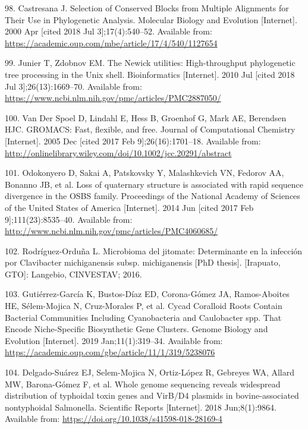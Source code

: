 \documentclass[12pt,twoside]{reedthesis}
\begin{document}
  \hypertarget{ref-castresana_selection_2000}{}
  98. Castresana J. Selection of Conserved Blocks from Multiple Alignments
  for Their Use in Phylogenetic Analysis. Molecular Biology and Evolution
  {[}Internet{]}. 2000 Apr {[}cited 2018 Jul 3{]};17(4):540--52. Available
  from: \url{https://academic.oup.com/mbe/article/17/4/540/1127654}
  
  \hypertarget{ref-junier_newick_2010}{}
  99. Junier T, Zdobnov EM. The Newick utilities: High-throughput
  phylogenetic tree processing in the Unix shell. Bioinformatics
  {[}Internet{]}. 2010 Jul {[}cited 2018 Jul 3{]};26(13):1669--70.
  Available from:
  \url{https://www.ncbi.nlm.nih.gov/pmc/articles/PMC2887050/}
  
  \hypertarget{ref-van_der_spoel_gromacs_2005}{}
  100. Van Der Spoel D, Lindahl E, Hess B, Groenhof G, Mark AE, Berendsen
  HJC. GROMACS: Fast, flexible, and free. Journal of Computational
  Chemistry {[}Internet{]}. 2005 Dec {[}cited 2017 Feb
  9{]};26(16):1701--18. Available from:
  \url{http://onlinelibrary.wiley.com/doi/10.1002/jcc.20291/abstract}
  
  \hypertarget{ref-odokonyero_loss_2014}{}
  101. Odokonyero D, Sakai A, Patskovsky Y, Malashkevich VN, Fedorov AA,
  Bonanno JB, et al. Loss of quaternary structure is associated with rapid
  sequence divergence in the OSBS family. Proceedings of the National
  Academy of Sciences of the United States of America {[}Internet{]}. 2014
  Jun {[}cited 2017 Feb 9{]};111(23):8535--40. Available from:
  \url{http://www.ncbi.nlm.nih.gov/pmc/articles/PMC4060685/}
  
  \hypertarget{ref-rodriguez_tesis_2016}{}
  102. Rodríguez-Orduña L. Microbioma del jitomate: Determinante en la
  infección por Clavibacter michiganensis subsp. michiganensis
  {[}PhD thesis{]}. {[}Irapuato, GTO{]}: Langebio, CINVESTAV; 2016.
  
  \hypertarget{ref-gutierrez-garcia_cycad_2019}{}
  103. Gutiérrez-García K, Bustos-Díaz ED, Corona-Gómez JA, Ramos-Aboites
  HE, Sélem-Mojica N, Cruz-Morales P, et al. Cycad Coralloid Roots Contain
  Bacterial Communities Including Cyanobacteria and Caulobacter spp. That
  Encode Niche-Specific Biosynthetic Gene Clusters. Genome Biology and
  Evolution {[}Internet{]}. 2019 Jan;11(1):319--34. Available from:
  \url{https://academic.oup.com/gbe/article/11/1/319/5238076}
  
  \hypertarget{ref-delgado-suarez_whole_2018}{}
  104. Delgado-Suárez EJ, Selem-Mojica N, Ortiz-López R, Gebreyes WA,
  Allard MW, Barona-Gómez F, et al. Whole genome sequencing reveals
  widespread distribution of typhoidal toxin genes and VirB/D4 plasmids in
  bovine-associated nontyphoidal Salmonella. Scientific Reports
  {[}Internet{]}. 2018 Jun;8(1):9864. Available from:
  \url{https://doi.org/10.1038/s41598-018-28169-4}
  
\end{document}
